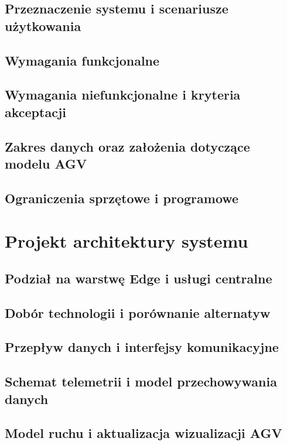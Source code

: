 \documentclass[11pt,a4paper]{report}
\begin{document}
\section{Przeznaczenie systemu i scenariusze użytkowania}
\section{Wymagania funkcjonalne}
\section{Wymagania niefunkcjonalne i kryteria akceptacji}
\section{Zakres danych oraz założenia dotyczące modelu AGV}
\section{Ograniczenia sprzętowe i programowe}

\chapter{Projekt architektury systemu}
\section{Podział na warstwę Edge i usługi centralne}
\section{Dobór technologii i porównanie alternatyw}
\section{Przepływ danych i interfejsy komunikacyjne}
\section{Schemat telemetrii i model przechowywania danych}
\section{Model ruchu i aktualizacja wizualizacji AGV}
\end{document}
